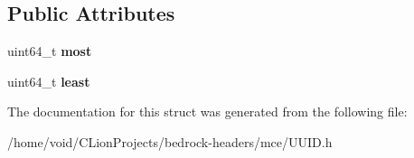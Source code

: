 \subsection*{Public Attributes}
\begin{DoxyCompactItemize}
\item 
\mbox{\label{structmce_1_1_u_u_i_d_a388eb9a4a570ee98ac8918d63b2f9e50}} 
uint64\+\_\+t {\bfseries most}
\item 
\mbox{\label{structmce_1_1_u_u_i_d_ae7b23715457999a98625d77259a27bb3}} 
uint64\+\_\+t {\bfseries least}
\end{DoxyCompactItemize}


The documentation for this struct was generated from the following file\+:\begin{DoxyCompactItemize}
\item 
/home/void/\+C\+Lion\+Projects/bedrock-\/headers/mce/U\+U\+I\+D.\+h\end{DoxyCompactItemize}

